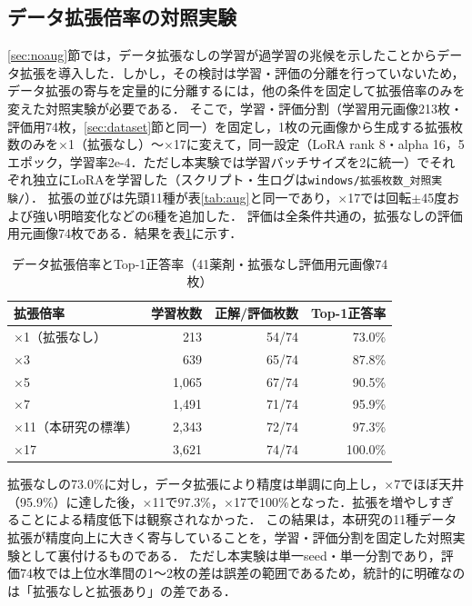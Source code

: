 \documentclass[dvipdfmx]{jsarticle}
\begin{document}
\subsection{データ拡張倍率の対照実験}\label{sec:auglevel}

\ref{sec:noaug}節では，データ拡張なしの学習が過学習の兆候を示したことからデータ拡張を導入した．しかし，その検討は学習・評価の分離を行っていないため，データ拡張の寄与を定量的に分離するには，他の条件を固定して拡張倍率のみを変えた対照実験が必要である．
そこで，学習・評価分割（学習用元画像213枚・評価用74枚，\ref{sec:dataset}節と同一）を固定し，1枚の元画像から生成する拡張枚数のみを$\times$1（拡張なし）〜$\times$17に変えて，同一設定（LoRA rank 8・alpha 16，5エポック，学習率2e-4．ただし本実験では学習バッチサイズを2に統一）でそれぞれ独立にLoRAを学習した（スクリプト・生ログは\texttt{windows/拡張枚数\_対照実験/}）．
拡張の並びは先頭11種が表\ref{tab:aug}と同一であり，$\times$17では回転$\pm$45度および強い明暗変化などの6種を追加した．
評価は全条件共通の，拡張なしの評価用元画像74枚である．結果を表\ref{tab:auglevel}に示す．

\begin{table}[htbp]
\centering
\caption{データ拡張倍率とTop-1正答率（41薬剤・拡張なし評価用元画像74枚）}
\label{tab:auglevel}
\begin{tabular}{lrrr}
\hline
拡張倍率 & 学習枚数 & 正解/評価枚数 & Top-1正答率 \\
\hline
$\times$1（拡張なし） & 213 & 54/74 & 73.0\% \\
$\times$3 & 639 & 65/74 & 87.8\% \\
$\times$5 & 1,065 & 67/74 & 90.5\% \\
$\times$7 & 1,491 & 71/74 & 95.9\% \\
$\times$11（本研究の標準） & 2,343 & 72/74 & 97.3\% \\
$\times$17 & 3,621 & 74/74 & 100.0\% \\
\hline
\end{tabular}
\end{table}

拡張なしの73.0\%に対し，データ拡張により精度は単調に向上し，$\times$7でほぼ天井（95.9\%）に達した後，$\times$11で97.3\%，$\times$17で100\%となった．拡張を増やしすぎることによる精度低下は観察されなかった．
この結果は，本研究の11種データ拡張が精度向上に大きく寄与していることを，学習・評価分割を固定した対照実験として裏付けるものである．
ただし本実験は単一seed・単一分割であり，評価74枚では上位水準間の1〜2枚の差は誤差の範囲であるため，統計的に明確なのは「拡張なしと拡張あり」の差である．
\end{document}
